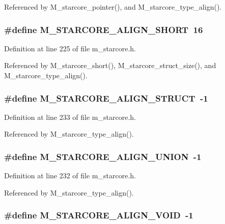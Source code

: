 Referenced by M\_\-starcore\_\-pointer(), and M\_\-starcore\_\-type\_\-align().
\subsubsection{\setlength{\rightskip}{0pt plus 5cm}\#define M\_\-STARCORE\_\-ALIGN\_\-SHORT~16}\label{m__starcore_8h_8fde65869d5e2843fdaf8b441e7ab63d}




Definition at line 225 of file m\_\-starcore.h.

Referenced by M\_\-starcore\_\-short(), M\_\-starcore\_\-struct\_\-size(), and M\_\-starcore\_\-type\_\-align().
\subsubsection{\setlength{\rightskip}{0pt plus 5cm}\#define M\_\-STARCORE\_\-ALIGN\_\-STRUCT~-1}\label{m__starcore_8h_9265777226deaa17fbd01e87d02a9d2e}




Definition at line 233 of file m\_\-starcore.h.

Referenced by M\_\-starcore\_\-type\_\-align().
\subsubsection{\setlength{\rightskip}{0pt plus 5cm}\#define M\_\-STARCORE\_\-ALIGN\_\-UNION~-1}\label{m__starcore_8h_97584ae8cfa43d5700a740ed76027abe}




Definition at line 232 of file m\_\-starcore.h.

Referenced by M\_\-starcore\_\-type\_\-align().
\subsubsection{\setlength{\rightskip}{0pt plus 5cm}\#define M\_\-STARCORE\_\-ALIGN\_\-VOID~-1}\label{m__starcore_8h_991d988df1e516854914545e735d5554}





